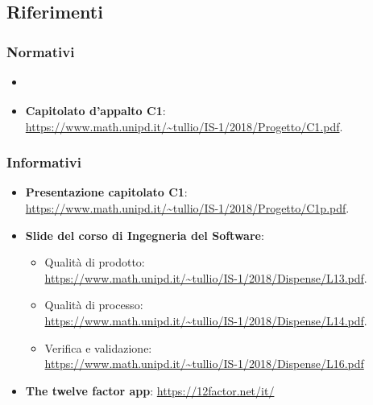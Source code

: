     \subsection{Riferimenti}
	
	\subsubsection{Normativi}
    \begin{itemize}
    	\item \textbf{\textit{\NdPv}}
    	\item \textbf{Capitolato d'appalto C1}:\\ \url{https://www.math.unipd.it/~tullio/IS-1/2018/Progetto/C1.pdf}.
    \end{itemize}
    
    \subsubsection{Informativi}
    \begin{itemize}
    	\item \textbf{Presentazione capitolato C1}:\\ \url{https://www.math.unipd.it/~tullio/IS-1/2018/Progetto/C1p.pdf}.
    	\item \textbf{Slide del corso di Ingegneria del Software}:
    	
    	\begin{itemize}
    		\item Qualità di prodotto:\\ \url{https://www.math.unipd.it/~tullio/IS-1/2018/Dispense/L13.pdf}.
    		\item Qualità di processo:\\ \url{https://www.math.unipd.it/~tullio/IS-1/2018/Dispense/L14.pdf}.
    		\item Verifica e validazione:\\
    		\url{https://www.math.unipd.it/~tullio/IS-1/2018/Dispense/L16.pdf}
    	\end{itemize}
    	\item \textbf{The twelve factor app}:
    	\url{https://12factor.net/it/}
    \end{itemize}